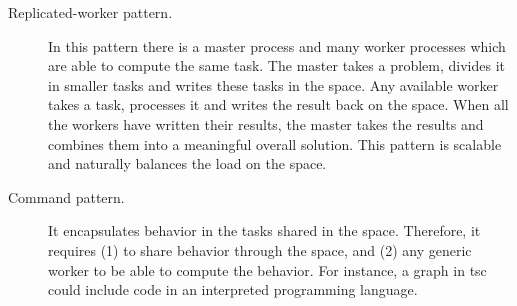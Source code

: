 \begin{description}
  \item[Replicated-worker pattern.] In this pattern there is a master process and many worker processes which are able to compute the same task.
				    The master takes a problem, divides it in smaller tasks and writes these tasks in the space.
				    Any available worker takes a task, processes it and writes the result back on the space.
				    When all the workers have written their results, the master takes the results and combines them into a meaningful overall solution.
				    This pattern is scalable and naturally balances the load on the space.
  \item[Command pattern.] It encapsulates behavior in the tasks shared in the space.
			  Therefore, it requires (1) to share behavior through the space, and (2) any generic worker to be able to compute the behavior.
			  For instance, a graph in \ac{tsc} could include code in an interpreted programming language.

\end{description}
